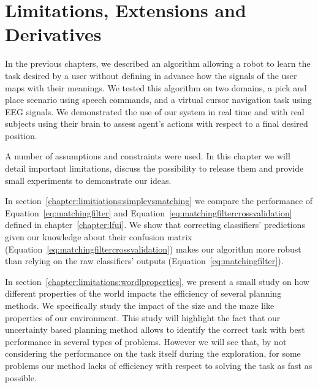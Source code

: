 
%
\chapter{Limitations, Extensions and Derivatives}
\label{chapter:limitations}
\minitoc


In the previous chapters, we described an algorithm allowing a robot to learn the task desired by a user without defining in advance how the signals of the user maps with their meanings. We tested this algorithm on two domains, a pick and place scenario using speech commands, and a virtual cursor navigation task using EEG signals. We demonstrated the use of our system in real time and with real subjects using their brain to assess agent's actions with respect to a final desired position.

A number of assumptions and constraints were used. In this chapter we will detail important limitations, discuss the possibility to release them and provide small experiments to demonstrate our ideas. 

In section~\ref{chapter:limitiations:simplevsmatching} we compare the performance of Equation~\ref{eq:matchingfilter} and Equation~\ref{eq:matchingfiltercrossvalidation} defined in chapter~\ref{chapter:lfui}. We show that correcting classifiers' predictions given our knowledge about their confusion matrix (Equation~\ref{eq:matchingfiltercrossvalidation}) makes our algorithm more robust than relying on the raw classifiers' outputs (Equation~\ref{eq:matchingfilter}).

In section~\ref{chapter:limitations:wordlproperties}, we present a small study on how different properties of the world impacts the efficiency of several planning methods. We specifically study the impact of the size and the maze like properties of our environment. This study will highlight the fact that our uncertainty based planning method allows to identify the correct task with best performance in several types of problems. However we will see that, by not considering the performance on the task itself during the exploration, for some problems our method lacks of efficiency with respect to solving the task as fast as possible.

